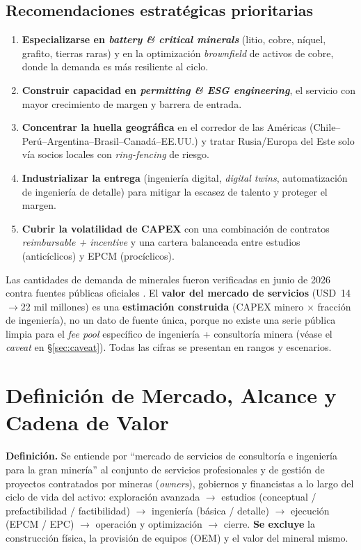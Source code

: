 \documentclass[11pt,letterpaper]{report}
\begin{document}
\section{Recomendaciones estratégicas prioritarias}
\begin{enumerate}[label=\textbf{R\arabic*.}]
\item \textbf{Especializarse en \emph{battery \& critical minerals}} (litio, cobre, níquel, grafito, tierras raras) y en la
      optimización \emph{brownfield} de activos de cobre, donde la demanda es más resiliente al ciclo.
\item \textbf{Construir capacidad en \emph{permitting \& ESG engineering}}, el servicio con mayor crecimiento de margen y barrera de entrada.
\item \textbf{Concentrar la huella geográfica} en el corredor de las Américas (Chile--Perú--Argentina--Brasil--Canadá--EE.UU.) y tratar
      Rusia/Europa del Este solo vía socios locales con \emph{ring-fencing} de riesgo.
\item \textbf{Industrializar la entrega} (ingeniería digital, \emph{digital twins}, automatización de ingeniería de detalle) para
      mitigar la escasez de talento y proteger el margen.
\item \textbf{Cubrir la volatilidad de CAPEX} con una combinación de contratos \emph{reimbursable + incentive} y una cartera
      balanceada entre estudios (anticíclicos) y EPCM (procíclicos).
\end{enumerate}

\begin{cajanota}
Las cantidades de demanda de minerales fueron verificadas en junio de 2026 contra fuentes públicas oficiales
\citep{iea_gcmo2025,usgs_mcs2025,oecd_steel2025,iai_demand,silver2025,benchmark_li}. El \textbf{valor del mercado de servicios}
(USD~14$\rightarrow$22 mil millones) es una \textbf{estimación construida} (CAPEX minero $\times$ fracción de ingeniería), no un dato de
fuente única, porque no existe una serie pública limpia para el \emph{fee pool} específico de ingeniería + consultoría minera
(véase el \emph{caveat} en \S\ref{sec:caveat}). Todas las cifras se presentan en rangos y escenarios.
\end{cajanota}

\chapter{Definición de Mercado, Alcance y Cadena de Valor}
\textbf{Definición.} Se entiende por ``mercado de servicios de consultoría e ingeniería para la gran minería'' al conjunto de
servicios profesionales y de gestión de proyectos contratados por mineras (\emph{owners}), gobiernos y financistas a lo largo del
ciclo de vida del activo: exploración avanzada $\rightarrow$ estudios (conceptual / prefactibilidad / factibilidad) $\rightarrow$
ingeniería (básica / detalle) $\rightarrow$ ejecución (EPCM / EPC) $\rightarrow$ operación y optimización $\rightarrow$ cierre.
\textbf{Se excluye} la construcción física, la provisión de equipos (OEM) y el valor del mineral mismo.
\end{document}
